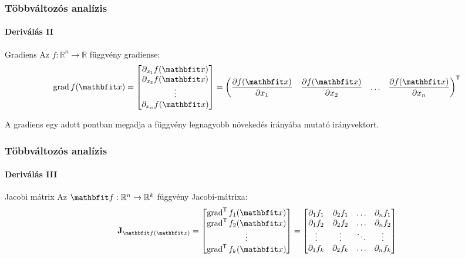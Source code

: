 \begin{frame}
  \frametitle{Többváltozós analízis}
  \framesubtitle{Deriválás II}

  \begin{block}{Gradiens}
    Az $f: \mathbb R^n \rightarrow \mathbb R$ függvény gradiense:
    \def\arraystretch{1.4}
    \newcommand\ds{\displaystyle}
    \[
      \grad f(\rvec x) = \begin{bmatrix}
        \partial_{x_1} f(\rvec x) \\
        \partial_{x_2} f(\rvec x) \\
        \vdots                    \\
        \partial_{x_n} f(\rvec x) \\
      \end{bmatrix} = \begin{pmatrix}
        \ds\pdv{f(\rvec x)}{x_1} &
        \ds\pdv{f(\rvec x)}{x_2} &
        \hdots                   &
        \ds\pdv{f(\rvec x)}{x_n}
      \end{pmatrix}^{\mathsf T}
    \]

    A gradiens egy adott pontban megadja a függvény legnagyobb növekedés
    irányába mutató irányvektort.
  \end{block}
\end{frame}

\begin{frame}
  \frametitle{Többváltozós analízis}
  \framesubtitle{Deriválás III}

  \begin{block}{Jacobi mátrix}
    Az $\rvec f: \mathbb R^n \rightarrow \mathbb R^k$ függvény Jacobi-mátrixa:
    \def\arraystretch{1.4}
    \newcommand\ds{\displaystyle}
    \[
      \rmat J_{\rvec f(\rvec x)}
      =
      \begin{bmatrix}
        \grad^{\mathsf T} f_1(\rvec x) \\
        \grad^{\mathsf T} f_2(\rvec x) \\
        \vdots                         \\
        \grad^{\mathsf T} f_k(\rvec x) \\
      \end{bmatrix}
      =
      \begin{bmatrix}
        \partial_1 f_1 & \partial_2 f_1 & \hdots & \partial_n f_1 \\
        \partial_1 f_2 & \partial_2 f_2 & \hdots & \partial_n f_2 \\
        \vdots         & \vdots         & \ddots & \vdots         \\
        \partial_1 f_k & \partial_2 f_k & \hdots & \partial_n f_k \\
      \end{bmatrix}
    \]
  \end{block}
\end{frame}

